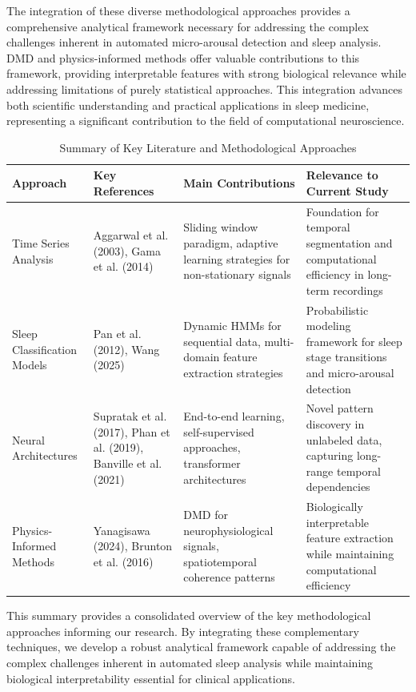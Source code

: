 \documentclass[a4paper,12pt,twoside]{article}
\begin{document}
The integration of these diverse methodological approaches provides a comprehensive analytical framework necessary for addressing the complex challenges inherent in automated micro-arousal detection and sleep analysis. DMD and physics-informed methods offer valuable contributions to this framework, providing interpretable features with strong biological relevance while addressing limitations of purely statistical approaches. This integration advances both scientific understanding and practical applications in sleep medicine, representing a significant contribution to the field of computational neuroscience.



\begin{table}[H]
\centering
\caption{Summary of Key Literature and Methodological Approaches}
\begin{tabular}{|p{2.5cm}|p{3cm}|p{3cm}|p{5cm}|}
\hline
\textbf{Approach} & \textbf{Key References} & \textbf{Main Contributions} & \textbf{Relevance to Current Study} \\
\hline
Time Series Analysis & Aggarwal et al. (2003), Gama et al. (2014) & Sliding window paradigm, adaptive learning strategies for non-stationary signals & Foundation for temporal segmentation and computational efficiency in long-term recordings \\
\hline
Sleep Classification Models & Pan et al. (2012), Wang (2025) & Dynamic HMMs for sequential data, multi-domain feature extraction strategies & Probabilistic modeling framework for sleep stage transitions and micro-arousal detection \\
\hline
Neural Architectures & Supratak et al. (2017), Phan et al. (2019), Banville et al. (2021) & End-to-end learning, self-supervised approaches, transformer architectures & Novel pattern discovery in unlabeled data, capturing long-range temporal dependencies \\
\hline
Physics-Informed Methods & Yanagisawa (2024), Brunton et al. (2016) & DMD for neurophysiological signals, spatiotemporal coherence patterns & Biologically interpretable feature extraction while maintaining computational efficiency \\
\hline
\end{tabular}
\label{tab:literature_summary}
\end{table}

This summary provides a consolidated overview of the key methodological approaches informing our research. By integrating these complementary techniques, we develop a robust analytical framework capable of addressing the complex challenges inherent in automated sleep analysis while maintaining biological interpretability essential for clinical applications.
\end{document}
